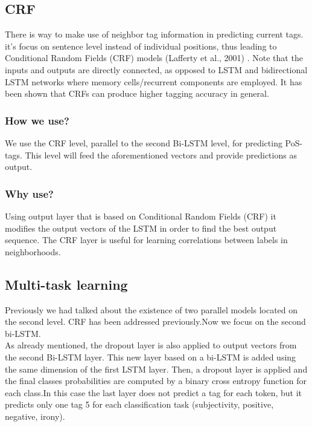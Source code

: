 \documentclass[twocolumn,10pt]{wmrDoc}
\begin{document}
\subsection{CRF}
There is way to make use of neighbor tag information in predicting current tags. it's focus on sentence level instead of individual positions, thus leading to Conditional Random Fields (CRF) models \cite{Lafferty01conditionalrandom}(Lafferty et al., 2001) . Note that the inputs and outputs are directly connected, as opposed to LSTM and bidirectional LSTM networks where memory cells/recurrent components are employed.
It has been shown that CRFs can produce higher tagging accuracy in general.
\subsubsection{How we use?}
We use the CRF level, parallel to the second Bi-LSTM level, for predicting PoS-tags. 
This level will feed the aforementioned vectors and provide predictions as output.

\subsubsection{Why use?}
Using output layer that is based on Conditional Random Fields (CRF) it modifies the output vectors of the LSTM in order to find the best output sequence. The CRF layer is useful for learning correlations between labels in neighborhoods.

\vskip 1cm

\subsection{Multi-task learning}

Previously we had talked about the existence of two parallel models located on the second level.
CRF has been addressed previously.Now we focus on the second bi-LSTM.\\
As already mentioned, the dropout layer is also applied to output vectors from the second Bi-LSTM layer. 
This new layer based on a bi-LSTM is added using the same dimension of the first LSTM layer.
Then, a dropout layer is applied and the final classes probabilities are computed by a binary
cross entropy function for each class.In this case the last layer does not predict a tag for each token, but it predicts only one tag 5 for each classification task (subjectivity, positive, negative, irony). 
\end{document}
